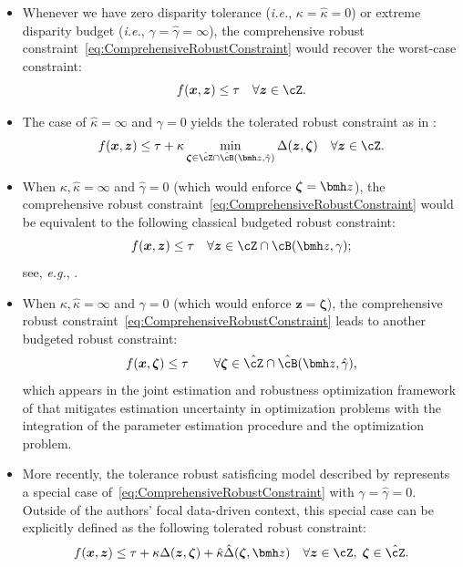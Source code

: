 \documentclass[mnsc, nonblindrev]{informswp}
\newcommand{\1}[1]{\mathds{1}{\left(#1\right)}}
\begin{document}
\begin{itemize}
\item Whenever we have zero disparity tolerance (\textit{i.e.}, $\kappa = \hat \kappa = 0$) or extreme disparity budget (\textit{i.e.}, $\gamma = \hat \gamma =\infty$),  the comprehensive robust constraint~\eqref{eq:ComprehensiveRobustConstraint} would recover the worst-case constraint:
\[
f(\bm x,\bm z) \leq \tau ~~~\forall \bm z \in \cZ.
\]

\item The case of $\hat \kappa = \infty$ and $\gamma = 0$ yields the tolerated robust constraint as in \cite{BenTal_et_al_2017globalized}:
$$
f({\bm x},{\bm z}) \leq \tau + \kappa  \min_{\bm \zeta \in \hat \cZ \cap \hat \cB(\bmh z, \hat \gamma)} \Delta(\bm z,\bm \zeta)  ~~~\forall \bm z \in \cZ.
$$

\item When $\kappa, \hat \kappa = \infty$ and $\hat \gamma=0$ (which would enforce $\bm \zeta = \bmh z$), the comprehensive robust constraint~\eqref{eq:ComprehensiveRobustConstraint} would be equivalent to the following classical budgeted robust constraint:
$$
f({\bm x},{\bm z}) \leq \tau ~~~\forall \bm z \in \cZ \cap \cB(\bmh z, \gamma);
$$ 
see, \textit{e.g.}, \cite{bertsimas2004price}.

\item When $\kappa, \hat \kappa = \infty$ and $\gamma = 0$ (which would enforce $\bm z = \bm \zeta$), the comprehensive robust constraint~\eqref{eq:ComprehensiveRobustConstraint} leads to another budgeted robust constraint:
$$
f({\bm x},{\bm \zeta}) \leq \tau \quad \quad \forall \bm \zeta \in \hat \cZ\cap \hat \cB(\bmh z, \hat \gamma),
$$
which appears in the joint estimation and robustness optimization framework of \cite{Zhu_Xie_Sim_2021joint} that mitigates estimation uncertainty in optimization problems with the integration of the parameter estimation procedure and the optimization problem.

\item More recently, the tolerance robust satisficing model described by \cite{sim2024analytics} represents a special case of~\eqref{eq:ComprehensiveRobustConstraint} with $\gamma = \hat \gamma = 0$. Outside of the authors' focal data-driven context, this special case can be explicitly defined as the following tolerated robust constraint:
$$
f(\bm x,\bm z) \leq \tau + \kappa \Delta(\bm z,\bm \zeta) + \hat \kappa \hat \Delta(\bm \zeta,\bmh z) ~~~\forall \bm z \in \cZ , \; \bm \zeta \in \hat \cZ.
$$
\end{itemize}
\end{document}
